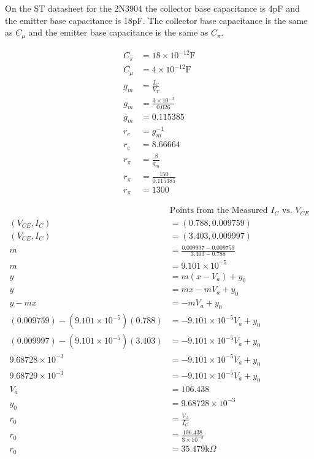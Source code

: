 \documentclass{article}
\begin{document}
On the ST datasheet for the 2N3904 the collector base capacitance
 is 4pF and the emitter base capacitance is 18pF. The collector 
 base capacitance is the same as $C_{\mu}$ and the emitter base 
 capacitance is the same as $C_{\pi}$.

\begin{align*}
C_{\pi } & =18\times 10^{-12}\text{F}\\
C_{\mu } & =4\times 10^{-12}\text{F}\\
g_{m} & =\frac{I_{C}}{V_{T}}\\
g_{m} & =\frac{3\times 10^{-3}}{0.026}\\
g_{m} & =0.115385\\
r_{e} & =g^{-1}_{m}\\
r_{e} & =8.66664\\
r_{\pi } & =\frac{\beta }{g_{m}}\\
r_{\pi } & =\frac{150}{0.115385}\\
r_{\pi } & =1300
\end{align*}

\begin{align*}
 & \text{Points from the Measured } I_C \text{ vs. } V_{CE}\\
( V_{CE} ,I_{C}) & =( 0.788,0.009759)\\
( V_{CE} ,I_{C}) & =( 3.403,0.009997)\\
m & =\frac{0.009997-0.009759}{3.403-0.788}\\
m & =9.101\times 10^{-5}\\
y & =m( x-V_{a}) +y_{0}\\
y & =mx-mV_{a} +y_{0}\\
y-mx & =-mV_{a} +y_{0}\\
( 0.009759) -\left( 9.101\times 10^{-5}\right)( 0.788) & =-9.101\times 10^{-5} V_{a} +y_{0}\\
( 0.009997) -\left( 9.101\times 10^{-5}\right)( 3.403) & =-9.101\times 10^{-5} V_{a} +y_{0}\\
9.68728\times 10^{-3} & =-9.101\times 10^{-5} V_{a} +y_{0}\\
9.68729\times 10^{-3} & =-9.101\times 10^{-5} V_{a} +y_{0}\\
V_{a} & =106.438\\
y_{0} & =9.68728\times 10^{-3}\\
r_{0} & =\frac{V_{A}}{I_{C}}\\
r_{0} & =\frac{106.438}{3\times 10^{-3}}\\
r_{0} & =35.479\text{k} \Omega 
\end{align*}
\end{document}
